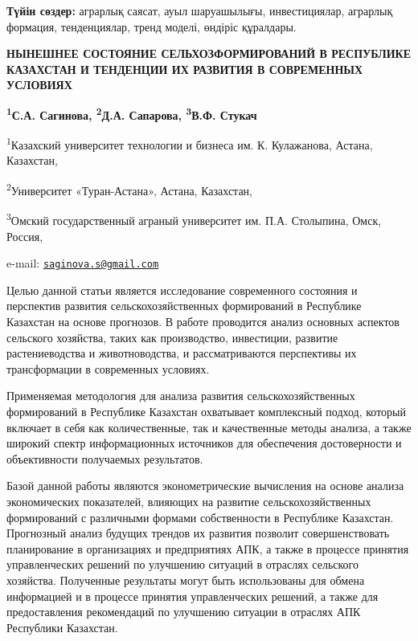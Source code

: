 {\bfseries Түйін сөздер:} аграрлық саясат, ауыл шаруашылығы, инвестициялар,
аграрлық формация, тенденциялар, тренд моделі, өндіріс құралдары.
\begin{articleheader}

{\bfseries НЫНЕШНЕЕ  СОСТОЯНИЕ СЕЛЬХОЗФОРМИРОВАНИЙ В РЕСПУБЛИКЕ КАЗАХСТАН И
ТЕНДЕНЦИИ ИХ РАЗВИТИЯ В СОВРЕМЕННЫХ УСЛОВИЯХ}

{\bfseries \textsuperscript{1}С.А. Сагинова\textsuperscript{\envelope },
\textsuperscript{2}Д.А. Сапарова, \textsuperscript{3}В.Ф. Стукач}
\end{articleheader}
\begin{affiliation}

\textsuperscript{1}Казахский университет технологии и бизнеса им. К.
Кулажанова, Астана, Казахстан,

\textsuperscript{2}Университет «Туран-Астана», Астана, Казахстан,

\textsuperscript{3}Омский государственный аграный университет им. П.А.
Столыпина, Омск, Россия,

e-mail: \href{mailto:saginova.s@gmail.com}{\nolinkurl{saginova.s@gmail.com}}
\end{affiliation}

Целью данной статьи является исследование современного состояния и
перспектив развития сельскохозяйственных формирований в Республике
Казахстан на основе прогнозов. В работе проводится анализ основных
аспектов сельского хозяйства, таких как производство, инвестиции,
развитие растениеводства и животноводства, и рассматриваются перспективы
их трансформации в современных условиях.

Применяемая методология для анализа развития сельскохозяйственных
формирований в Республике Казахстан охватывает комплексный подход,
который включает в себя как количественные, так и качественные методы
анализа, а также широкий спектр информационных источников для
обеспечения достоверности и объективности получаемых результатов.

Базой данной работы являются эконометрические вычисления на основе
анализа экономических показателей, влияющих на развитие
сельскохозяйственных формирований с различными формами собственности в
Республике Казахстан. Прогнозный анализ будущих трендов их развития
позволит совершенствовать планирование в организациях и предприятиях
АПК, а также в процессе принятия управленческих решений по улучшению
ситуаций в отраслях сельского хозяйства. Полученные результаты могут
быть использованы для обмена информацией и в процессе принятия
управленческих решений, а также для предоставления рекомендаций по
улучшению ситуации в отраслях АПК Республики Казахстан.

